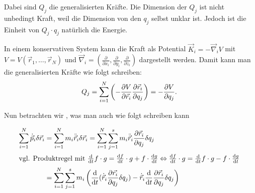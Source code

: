 Dabei sind $Q_j$ die generalisierten Kräfte. Die Dimension der $Q_j$ ist nicht unbedingt Kraft, weil die Dimension von den $q_j$ selbst unklar ist. Jedoch ist die Einheit von $Q_j \cdot q_j$ natürlich die Energie.

\begin{bemerkung*}
	In einem konservativen System kann die Kraft als Potential $\vec{K}_i = - \vec\nabla_i V$ 
	mit $V = V(\vec{r}_1, \dots, \vec{r}_N)$ 
	und $\vec{\nabla}_i = \left( \frac{\partial}{\partial x_i}, \frac{\partial}{\partial y_i}, \frac{\partial}{\partial z_i} \right)$ 
	dargestellt werden. Damit kann man die generalisierten Kräfte wie folgt schreiben:
	\[
		Q_j = \sum_{i = 1}^N \left( - \frac{\partial V}{\partial \vec{r}_i} \frac{\partial \vec{r}_i}{\partial q_j} \right) = - \frac{\partial V}{\partial q_j}
		\text{.}
	\]
\end{bemerkung*}

Nun betrachten wir , was man auch wie folgt schreiben kann

\begin{align*}
\sum_{i = 1}^{N} \dot{\vec{p}}_i \delta \vec{r}_i 
&= \sum_{i = 1}^N m_i \ddot{\vec{r}}_i \delta \vec{r}_i 
= \sum_{i = 1}^N \sum_{j = 1}^s m_i \ddot{\vec{r}}_i  \frac{\partial \vec{r}_i}{\partial q_j} \delta q_j \\
\intertext{vgl. Produktregel mit $\frac{\mathrm d}{\mathrm d t} f \cdot g = \frac{\mathrm d f}{\mathrm d t} \cdot g + f \cdot \frac{\mathrm d g}{\mathrm d t} \Leftrightarrow \frac{\mathrm d f}{\mathrm d t} \cdot g = \frac{\mathrm d}{\mathrm d t} f \cdot g - f \cdot \frac{\mathrm d g}{\mathrm d t}$}
&= \sum_{i=1}^N \sum_{j=1}^s m_i \left(\frac{\mathrm d}{\mathrm d t} (\dot{\vec{r}}_i \frac{\partial \vec{r_i}}{\partial q_j} \delta q_j) -\dot{\vec{r}}_i \frac{\mathrm d}{\mathrm d t} \frac{\partial \vec{r}_i}{\partial q_j} \delta q_j \right)
\end{align*}

